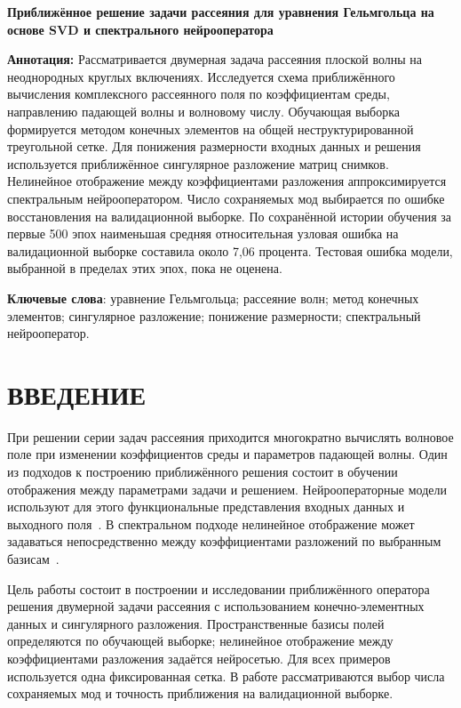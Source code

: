 \documentclass[notitle]{sibjima_preview}
\begin{document}
\thispagestyle{plain}
\pagestyle{plain}
\begin{center}
{\bfseries Приближённое решение задачи рассеяния для уравнения Гельмгольца на основе SVD и спектрального нейрооператора}
\end{center}

\textbf{Аннотация:} Рассматривается двумерная задача рассеяния плоской волны на неоднородных круглых включениях. Исследуется схема приближённого вычисления комплексного рассеянного поля по коэффициентам среды, направлению падающей волны и волновому числу. Обучающая выборка формируется методом конечных элементов на общей неструктурированной треугольной сетке. Для понижения размерности входных данных и решения используется приближённое сингулярное разложение матриц снимков. Нелинейное отображение между коэффициентами разложения аппроксимируется спектральным нейрооператором. Число сохраняемых мод выбирается по ошибке восстановления на валидационной выборке. По сохранённой истории обучения за первые 500 эпох наименьшая средняя относительная узловая ошибка на валидационной выборке составила около 7,06 процента. Тестовая ошибка модели, выбранной в пределах этих эпох, пока не оценена.

\textbf{Ключевые слова}: уравнение Гельмгольца; рассеяние волн; метод конечных элементов; сингулярное разложение; понижение размерности; спектральный нейрооператор.

\section{ВВЕДЕНИЕ}
При решении серии задач рассеяния приходится многократно вычислять волновое поле при изменении коэффициентов среды и параметров падающей волны. Один из подходов к построению приближённого решения состоит в обучении отображения между параметрами задачи и решением. Нейрооператорные модели используют для этого функциональные представления входных данных и выходного поля~\cite{li2020}. В спектральном подходе нелинейное отображение может задаваться непосредственно между коэффициентами разложений по выбранным базисам~\cite{fanaskov2022}.

Цель работы состоит в построении и исследовании приближённого оператора решения двумерной задачи рассеяния с использованием конечно-элементных данных и сингулярного разложения. Пространственные базисы полей определяются по обучающей выборке; нелинейное отображение между коэффициентами разложения задаётся нейросетью. Для всех примеров используется одна фиксированная сетка. В работе рассматриваются выбор числа сохраняемых мод и точность приближения на валидационной выборке.
\end{document}
